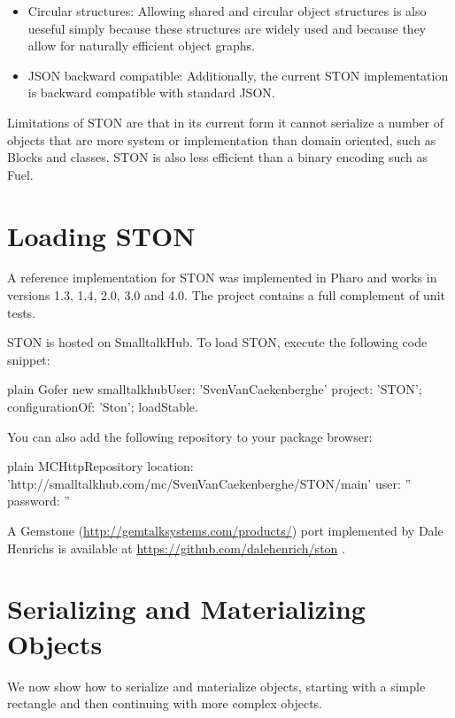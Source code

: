 \documentclass[10pt,twoside,english]{_support/latex/sbabook/sbabook}
\begin{document}
\begin{itemize}
\item Circular structures: Allowing shared and circular object structures is also ueseful simply because these structures are widely used and because they allow for naturally efficient object graphs.
\end{itemize}

\begin{itemize}
\item JSON backward compatible: Additionally, the current STON implementation is backward compatible with standard JSON.
\end{itemize}

Limitations of STON are that in its current form it cannot serialize a number of objects that are more system or
implementation than domain oriented, such as Blocks and classes. STON is also less efficient than a binary encoding such as Fuel.
\section{Loading STON}
A reference implementation for STON was implemented in Pharo and works in versions 1.3, 1.4, 2.0, 3.0 and 4.0.
The project contains a full complement of unit tests.

STON is hosted on SmalltalkHub. To load STON, execute the following code snippet:

\begin{displaycode}{plain}
Gofer new
   smalltalkhubUser: 'SvenVanCaekenberghe' project: 'STON';
   configurationOf: 'Ston';
   loadStable.
\end{displaycode}

You can also add the following repository to your package browser:

\begin{displaycode}{plain}
MCHttpRepository
   location: 'http://smalltalkhub.com/mc/SvenVanCaekenberghe/STON/main'
   user: ''
   password: ''
\end{displaycode}

A Gemstone (\url{http://gemtalksystems.com/products/}) port implemented by
Dale Henrichs is available at \url{https://github.com/dalehenrich/ston} .
\section{Serializing and Materializing Objects}
We now show how to serialize and materialize objects, starting with a simple rectangle and then continuing with more complex objects.
\end{document}
